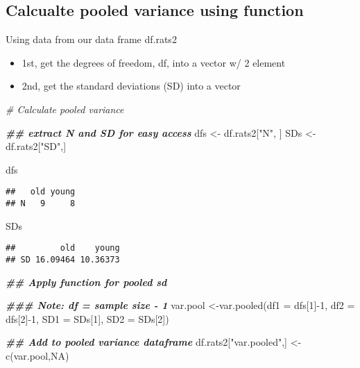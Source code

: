 \documentclass[
]{book}
\newenvironment{Shaded}{\begin{snugshade}}{\end{snugshade}}
\newcommand{\AttributeTok}[1]{\textcolor[rgb]{0.77,0.63,0.00}{#1}}
\newcommand{\CommentTok}[1]{\textcolor[rgb]{0.56,0.35,0.01}{\textit{#1}}}
\newcommand{\ConstantTok}[1]{\textcolor[rgb]{0.00,0.00,0.00}{#1}}
\newcommand{\DecValTok}[1]{\textcolor[rgb]{0.00,0.00,0.81}{#1}}
\newcommand{\DocumentationTok}[1]{\textcolor[rgb]{0.56,0.35,0.01}{\textbf{\textit{#1}}}}
\newcommand{\FunctionTok}[1]{\textcolor[rgb]{0.00,0.00,0.00}{#1}}
\newcommand{\NormalTok}[1]{#1}
\newcommand{\OtherTok}[1]{\textcolor[rgb]{0.56,0.35,0.01}{#1}}
\newcommand{\SpecialCharTok}[1]{\textcolor[rgb]{0.00,0.00,0.00}{#1}}
\newcommand{\StringTok}[1]{\textcolor[rgb]{0.31,0.60,0.02}{#1}}
\providecommand{\tightlist}{%
  \setlength{\itemsep}{0pt}\setlength{\parskip}{0pt}}
\begin{document}
\hypertarget{calcualte-pooled-variance-using-function}{%
\subsection{Calcualte pooled variance using function}\label{calcualte-pooled-variance-using-function}}

Using data from our data frame df.rats2

\begin{itemize}
\tightlist
\item
  1st, get the degrees of freedom, df, into a vector w/ 2 element
\item
  2nd, get the standard deviations (SD) into a vector
\end{itemize}

\begin{Shaded}
\begin{Highlighting}[]
\CommentTok{\# Calculate pooled variance}

\DocumentationTok{\#\# extract N and SD for easy access}
\NormalTok{dfs }\OtherTok{\textless{}{-}}\NormalTok{ df.rats2[}\StringTok{"N"}\NormalTok{, ]}
\NormalTok{SDs }\OtherTok{\textless{}{-}}\NormalTok{ df.rats2[}\StringTok{"SD"}\NormalTok{,]}

\NormalTok{dfs}
\end{Highlighting}
\end{Shaded}

\begin{verbatim}
##   old young
## N   9     8
\end{verbatim}

\begin{Shaded}
\begin{Highlighting}[]
\NormalTok{SDs}
\end{Highlighting}
\end{Shaded}

\begin{verbatim}
##         old    young
## SD 16.09464 10.36373
\end{verbatim}

\begin{Shaded}
\begin{Highlighting}[]
\DocumentationTok{\#\# Apply function for pooled sd}

\DocumentationTok{\#\#\# Note: df = sample size {-} 1}
\NormalTok{var.pool }\OtherTok{\textless{}{-}}\FunctionTok{var.pooled}\NormalTok{(}\AttributeTok{df1 =}\NormalTok{ dfs[}\DecValTok{1}\NormalTok{]}\SpecialCharTok{{-}}\DecValTok{1}\NormalTok{,}
                      \AttributeTok{df2 =}\NormalTok{ dfs[}\DecValTok{2}\NormalTok{]}\SpecialCharTok{{-}}\DecValTok{1}\NormalTok{,}
                      \AttributeTok{SD1 =}\NormalTok{ SDs[}\DecValTok{1}\NormalTok{],}
                      \AttributeTok{SD2 =}\NormalTok{ SDs[}\DecValTok{2}\NormalTok{])}

\DocumentationTok{\#\# Add to pooled variance dataframe}
\NormalTok{df.rats2[}\StringTok{"var.pooled"}\NormalTok{,] }\OtherTok{\textless{}{-}} \FunctionTok{c}\NormalTok{(var.pool,}\ConstantTok{NA}\NormalTok{)}
\end{Highlighting}
\end{Shaded}
\end{document}
